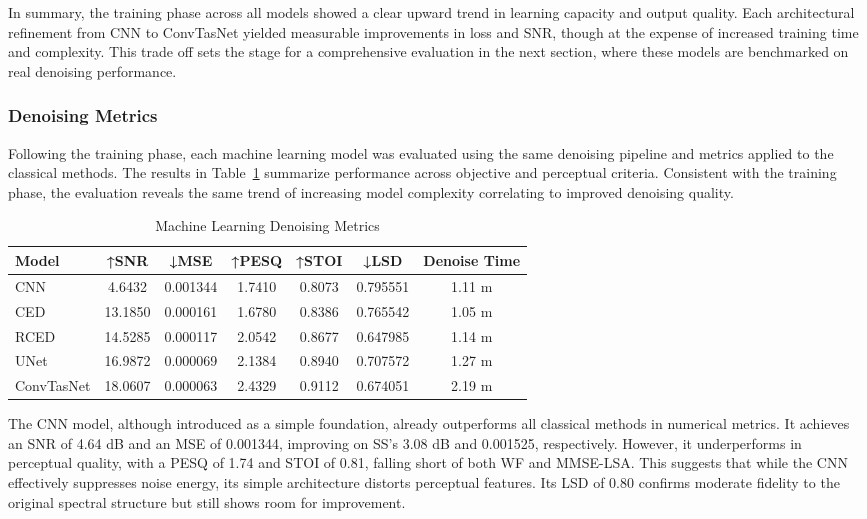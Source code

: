 In summary, the training phase across all models showed a clear upward trend in learning capacity and output quality. Each architectural refinement from CNN to ConvTasNet yielded measurable improvements in loss and SNR, though at the expense of increased training time and complexity. This trade off sets the stage for a comprehensive evaluation in the next section, where these models are benchmarked on real denoising performance.

\subsubsection{Denoising Metrics}
\label{sec:denoising_metrics}

Following the training phase, each machine learning model was evaluated using the same denoising pipeline and metrics applied to the classical methods. The results in Table~\ref{tab:ml_denoise} summarize performance across objective and perceptual criteria. Consistent with the training phase, the evaluation reveals the same trend of increasing model complexity correlating to improved denoising quality.

\vspace{1em}
\begin{table}[H]
\centering
\caption{Machine Learning Denoising Metrics}
\label{tab:ml_denoise}
\begin{tabular}{|l|c|c|c|c|c|c|}
\hline
\textbf{Model} & \textbf{↑SNR} & \textbf{↓MSE} & \textbf{↑PESQ} & \textbf{↑STOI} & \textbf{↓LSD} & \textbf{Denoise Time} \\
\hline
CNN         & 4.6432  & 0.001344 & 1.7410 & 0.8073 & 0.795551 & 1.11 m \\
CED         & 13.1850  & 0.000161 & 1.6780 & 0.8386 & 0.765542 & 1.05 m \\
RCED        & 14.5285  & 0.000117 & 2.0542 & 0.8677 & 0.647985 & 1.14 m \\
UNet        & 16.9872  & 0.000069 & 2.1384 & 0.8940 & 0.707572 & 1.27 m \\
ConvTasNet  & 18.0607 & 0.000063 & 2.4329 & 0.9112 & 0.674051 & 2.19 m \\
\hline
\end{tabular}
\end{table}

The CNN model, although introduced as a simple foundation, already outperforms all classical methods in numerical metrics. It achieves an SNR of 4.64 dB and an MSE of 0.001344, improving on SS’s 3.08 dB and 0.001525, respectively. However, it underperforms in perceptual quality, with a PESQ of 1.74 and STOI of 0.81, falling short of both WF and MMSE-LSA. This suggests that while the CNN effectively suppresses noise energy, its simple architecture distorts perceptual features. Its LSD of 0.80 confirms moderate fidelity to the original spectral structure but still shows room for improvement.


